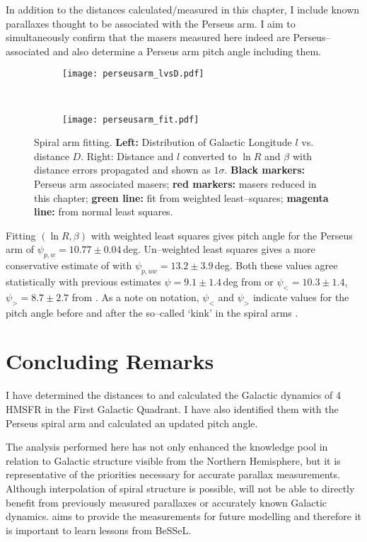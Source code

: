 			In addition to the distances calculated/measured in this chapter, I include known parallaxes thought to be associated with the Perseus arm. I aim to simultaneously confirm that the masers measured here indeed are Perseus--associated and also determine a Perseus arm pitch angle including them.
			
			\begin{figure}[h]
				\centering
				\begin{subfigure}[t]{0.45\textwidth}
					\centering
					\texttt{[image: perseusarm\_lvsD.pdf]}
				\end{subfigure}
				~
				\begin{subfigure}[t]{0.45\textwidth}
					\centering
					\texttt{[image: perseusarm\_fit.pdf]}
				\end{subfigure}
				\caption[Spiral Arm Fit]{Spiral arm fitting. \textbf{Left:} Distribution of Galactic Longitude $l$ vs. distance $D$. {Right:} Distance and $l$ converted to $\ln R$ and $\beta$ with distance errors propagated and shown as $1\sigma$. \textbf{Black markers:} Perseus arm associated masers; \textbf{red markers:} masers reduced in this chapter; \textbf{green line:} fit from weighted least--squares; \textbf{magenta line:} from normal least squares.}
			\end{figure}
			Fitting $(\ln R,\beta)$ with weighted least squares gives pitch angle for the Perseus arm of $\psi_{p,w}=10.77\pm0.04$\,deg. Un--weighted least squares gives a more conservative estimate of with $\psi_{p,uw}=13.2\pm3.9$\,deg. Both these values agree statistically with previous estimates $\psi=9.1\pm1.4$\,deg from \citet{Reid2014} or $\psi_<=10.3\pm1.4$, $\psi_>=8.7\pm2.7$ from \citet{Reid2019}. As a note on notation, $\psi_<$ and $\psi_>$ indicate values for the pitch angle before and after the so--called `kink' in the spiral arms \citep[see ][ for details]{Reid2019}.
				        
	\clearpage  
    \section{Concluding Remarks}
        I have determined the distances to and calculated the Galactic dynamics of 4 HMSFR in the First Galactic Quadrant. I have also identified them with the Perseus spiral arm and calculated an updated pitch angle.
		
		The analysis performed here has not only enhanced the knowledge pool in relation to Galactic structure visible from the Northern Hemisphere, but it is representative of the priorities necessary for accurate parallax measurements. Although interpolation of spiral structure is possible, \spirals\space will not be able to directly benefit from previously measured parallaxes or accurately known Galactic dynamics. \spirals\space aims to provide the measurements for future modelling and therefore it is important to learn lessons from BeSSeL.
		
